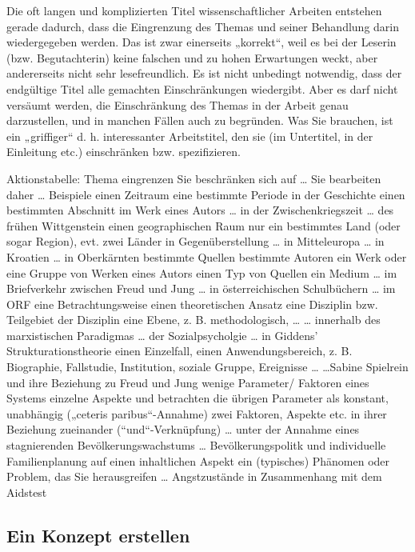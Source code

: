 \documentclass[]{article}
\begin{document}
Die oft langen und komplizierten Titel wissenschaftlicher Arbeiten
entstehen gerade dadurch, dass die Eingrenzung des Themas und seiner
Behandlung darin wiedergegeben werden. Das ist zwar einerseits
„korrekt``, weil es bei der Leserin (bzw. Begutachterin) keine falschen
und zu hohen Erwartungen weckt, aber andererseits nicht sehr
lesefreundlich. Es ist nicht unbedingt notwendig, dass der endgültige
Titel alle gemachten Einschränkungen wiedergibt. Aber es darf nicht
versäumt werden, die Einschränkung des Themas in der Arbeit genau
darzustellen, und in manchen Fällen auch zu begründen. Was Sie brauchen,
ist ein „griffiger`` d. h. interessanter Arbeitstitel, den sie (im
Untertitel, in der Einleitung etc.) einschränken bzw. spezifizieren.

Aktionstabelle: Thema eingrenzen Sie beschränken sich auf \ldots{} Sie
bearbeiten daher \ldots{} Beispiele einen Zeitraum eine bestimmte
Periode in der Geschichte einen bestimmten Abschnitt im Werk eines
Autors \ldots{} in der Zwischenkriegszeit \ldots{} des frühen
Wittgenstein einen geographischen Raum nur ein bestimmtes Land (oder
sogar Region), evt. zwei Länder in Gegenüberstellung \ldots{} in
Mitteleuropa \ldots{} in Kroatien \ldots{} in Oberkärnten bestimmte
Quellen bestimmte Autoren ein Werk oder eine Gruppe von Werken eines
Autors einen Typ von Quellen ein Medium \ldots{} im Briefverkehr
zwischen Freud und Jung \ldots{} in österreichischen Schulbüchern
\ldots{} im ORF eine Betrachtungsweise einen theoretischen Ansatz eine
Disziplin bzw. Teilgebiet der Disziplin eine Ebene, z. B.
methodologisch, \ldots{} \ldots{} innerhalb des marxistischen Paradigmas
\ldots{} der Sozialpsycholgie \ldots{} in Giddens' Strukturationstheorie
einen Einzelfall, einen Anwendungsbereich, z. B. Biographie, Fallstudie,
Institution, soziale Gruppe, Ereignisse \ldots{} \ldots{}Sabine
Spielrein und ihre Beziehung zu Freud und Jung wenige Parameter/
Faktoren eines Systems einzelne Aspekte und betrachten die übrigen
Parameter als konstant, unabhängig („ceteris paribus``-Annahme) zwei
Faktoren, Aspekte etc. in ihrer Beziehung zueinander
(``und``-Verknüpfung) \ldots{} unter der Annahme eines stagnierenden
Bevölkerungswachstums \ldots{} Bevölkerungspolitk und individuelle
Familienplanung auf einen inhaltlichen Aspekt ein (typisches) Phänomen
oder Problem, das Sie herausgreifen \ldots{} Angstzustände in
Zusammenhang mit dem Aidstest

\subsection{Ein Konzept erstellen}\label{ein-konzept-erstellen}
\end{document}
